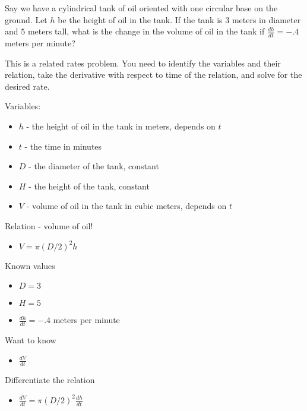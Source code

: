 \documentclass{ximera}
\author{Emma Smith Zbarsky}
\begin{document}
\begin{exercise}

Say we have a cylindrical tank of oil oriented with one circular base on
the ground. Let $h$ be the height of oil in the tank. If the tank is $3$
meters in diameter and $5$ meters tall, what is the change in the volume
of oil in the tank if $\frac{dh}{dt} = -.4$ meters per minute?


\begin{hint}
This is a related rates problem. You need to identify the variables and
their relation, take the derivative with respect to time of the
relation, and solve for the desired rate.
\end{hint}


\begin{hint}
Variables:

\begin{itemize}
\item
  $h$ - the height of oil in the tank in meters, depends on $t$
\item
  $t$ - the time in minutes
\item
  $D$ - the diameter of the tank, constant
\item
  $H$ - the height of the tank, constant
\item
  $V$ - volume of oil in the tank in cubic meters, depends on $t$
\end{itemize}

Relation - volume of oil!

\begin{itemize}
\itemsep1pt\parskip0pt
\item
  $V = \pi (D/2)^2h$
\end{itemize}

Known values

\begin{itemize}
\item
  $D = 3$
\item
  $H = 5$
\item
  $\frac{dh}{dt} = -.4$ meters per minute
\end{itemize}

Want to know

\begin{itemize}
\itemsep1pt\parskip0pt
\item
  $\frac{dV}{dt}$
\end{itemize}

Differentiate the relation

\begin{itemize}
\itemsep1pt\parskip0pt
\item
  $\frac{dV}{dt} = \pi (D/2)^2 \frac{dh}{dt}$
\end{itemize}


\end{hint}
\end{exercise}
\end{document}
